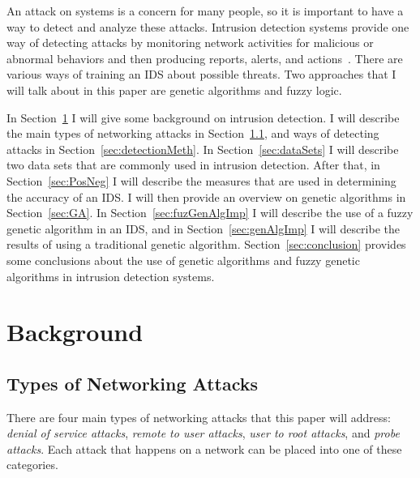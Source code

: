 \documentclass{sig-alternate}
\begin{document}
An attack on systems is a concern for many people, so it is important to have a way to detect and analyze these attacks. Intrusion detection systems provide one way of detecting attacks by monitoring network activities for malicious or abnormal behaviors and then producing reports, alerts, and actions~\cite{DBLP:journals/corr/abs-1204-1336}. There are various ways of training an IDS about possible threats. Two approaches that I will talk about in this paper are genetic algorithms and fuzzy logic.

In Section~\ref{sec:background} I will give some background on intrusion detection. I will describe the main types of networking attacks in Section~\ref{sec:typesAttacks}, and ways of detecting attacks in Section~\ref{sec:detectionMeth}. In Section~\ref{sec:dataSets} I will describe two data sets that are commonly used in intrusion detection. After that,  in Section~\ref{sec:PosNeg} I will describe the measures that are used in determining the accuracy of an IDS. I will then provide an overview on genetic algorithms in Section~\ref{sec:GA}. In Section~\ref{sec:fuzGenAlgImp} I will describe the use of a fuzzy genetic algorithm in an IDS, and in Section~\ref{sec:genAlgImp} I will describe the results of using a traditional genetic algorithm. Section~\ref{sec:conclusion} provides some conclusions about the use of genetic algorithms and fuzzy genetic algorithms in intrusion detection systems.




\section{Background}
\label{sec:background}

\subsection{Types of Networking Attacks}
\label{sec:typesAttacks}
There are four main types of networking attacks that this paper will address: \emph{denial of service attacks}, \emph{remote to user attacks}, \emph{user to root attacks}, and \emph{probe attacks}. Each attack that happens on a network can be placed into one of these categories.~\cite{DBLP:journals/corr/abs-1204-1336}
\end{document}
